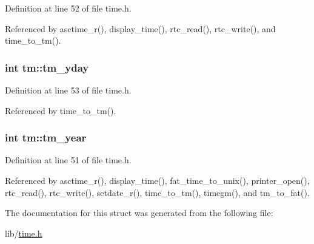 Definition at line 52 of file time.\-h.



Referenced by asctime\-\_\-r(), display\-\_\-time(), rtc\-\_\-read(), rtc\-\_\-write(), and time\-\_\-to\-\_\-tm().

\hypertarget{structtm_a93a0ba77cc23796df84405dcbcc57eb1}{
\subsubsection[{tm\-\_\-yday}]{\setlength{\rightskip}{0pt plus 5cm}int tm\-::tm\-\_\-yday}}\label{structtm_a93a0ba77cc23796df84405dcbcc57eb1}


Definition at line 53 of file time.\-h.



Referenced by time\-\_\-to\-\_\-tm().

\hypertarget{structtm_a33adf78fd6476b2120ce3b9c4a852053}{
\subsubsection[{tm\-\_\-year}]{\setlength{\rightskip}{0pt plus 5cm}int tm\-::tm\-\_\-year}}\label{structtm_a33adf78fd6476b2120ce3b9c4a852053}


Definition at line 51 of file time.\-h.



Referenced by asctime\-\_\-r(), display\-\_\-time(), fat\-\_\-time\-\_\-to\-\_\-unix(), printer\-\_\-open(), rtc\-\_\-read(), rtc\-\_\-write(), setdate\-\_\-r(), time\-\_\-to\-\_\-tm(), timegm(), and tm\-\_\-to\-\_\-fat().



The documentation for this struct was generated from the following file\-:\begin{DoxyCompactItemize}
\item 
lib/\hyperlink{time_8h}{time.\-h}\end{DoxyCompactItemize}
